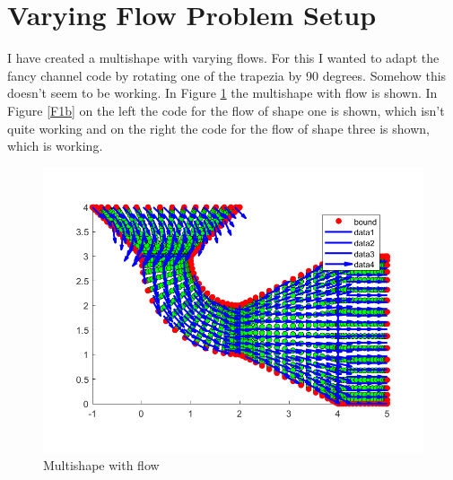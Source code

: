 \documentclass[11pt, a4paper]{article}
\theoremstyle{definition}
\begin{document}
	\section{Varying Flow Problem Setup}
	I have created a multishape with varying flows. For this I wanted to adapt the fancy channel code by rotating one of the trapezia by 90 degrees. Somehow this doesn't seem to be working. In Figure \ref{F1a} the multishape with flow is shown. In Figure \ref{F1b} on the left the code for the flow of shape one is shown, which isn't quite working and on the right the code for the flow of shape three is shown, which is working.
	
		\begin{figure}[h]
			\centering
			\includegraphics[scale=0.5]{F1.png}
			\caption{Multishape with flow} 
			\label{F1a}
		\end{figure}
\end{document}
